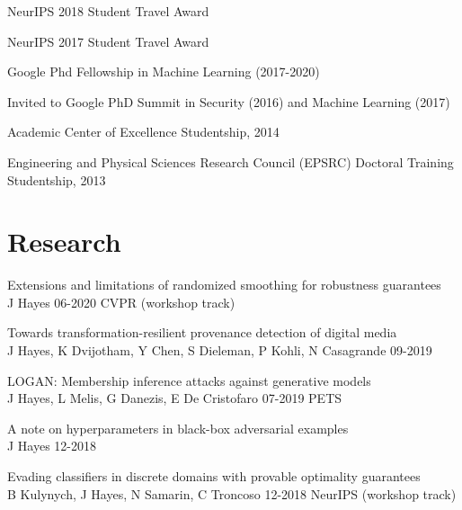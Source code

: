 \documentclass[margin,line]{res}
\begin{document}
\begin{resume}


NeurIPS 2018 Student Travel Award\newline

\vspace*{-3mm}

NeurIPS 2017 Student Travel Award\newline

\vspace*{-3mm}

Google Phd Fellowship in Machine Learning (2017-2020)\newline

\vspace*{-3mm}

\noindent Invited to Google PhD Summit in Security (2016) and Machine
Learning (2017)\newline

\vspace*{-3mm}

Academic Center of Excellence Studentship, 2014\newline

\vspace*{-3mm}

Engineering and Physical Sciences Research Council (EPSRC) Doctoral
Training Studentship, 2013


\section{\sc Research}

Extensions and limitations of randomized smoothing for robustness guarantees\\
J Hayes 06-2020 CVPR (workshop track)  

Towards transformation-resilient provenance detection of digital media\\
J Hayes, K Dvijotham, Y Chen, S Dieleman, P Kohli, N Casagrande 09-2019  

LOGAN: Membership inference attacks against generative models\\
J Hayes, L Melis, G Danezis, E De Cristofaro 07-2019 PETS  

A note on hyperparameters in black-box adversarial examples\\
J Hayes 12-2018  

Evading classifiers in discrete domains with provable optimality guarantees\\
B Kulynych, J Hayes, N Samarin, C Troncoso 12-2018 NeurIPS (workshop track)  


\end{resume}
\end{document}
